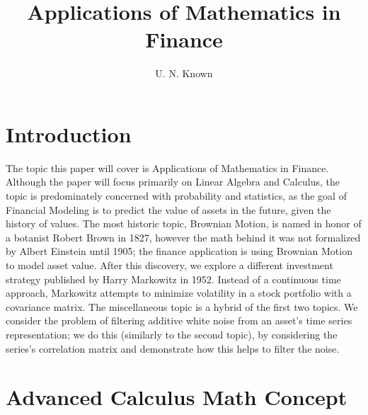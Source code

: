 \documentclass[final]{siamart1116}
\title{Applications of Mathematics in Finance}
\author{U. N. Known}
\begin{document}
\maketitle

\section{Introduction}
\label{sec:intro}

The topic this paper will cover is Applications of Mathematics in Finance. Although the paper will focus primarily on Linear Algebra and Calculus, the topic is predominately concerned with probability and statistics, as the goal of Financial Modeling is to predict the value of assets in the future, given the history of values. The most historic topic, Brownian Motion, is named in honor of a botanist Robert Brown in 1827, however the math behind it was not formalized by Albert Einstein until 1905; the finance application is using Brownian Motion to model asset value. After this discovery, we explore a different investment strategy published by Harry Markowitz in 1952. Instead of a continuous time approach, Markowitz attempts to minimize volatility in a stock portfolio with a covariance matrix. The miscellaneous topic is a hybrid of the first two topics. We consider the problem of filtering additive white noise from an asset's time series representation; we do this (similarly to the second topic), by considering the series's correlation matrix and demonstrate how this helps to filter the noise.


\section{Advanced Calculus Math Concept}
\label{sec:ac}
\end{document}
